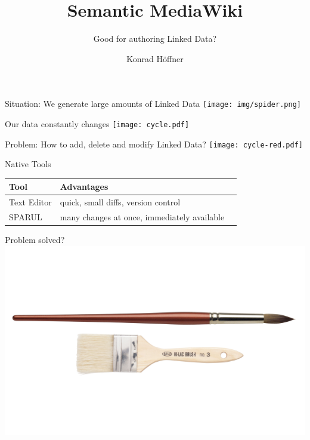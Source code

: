 \documentclass[aspectratio=1610]{beamer}
\title{Semantic MediaWiki}
\subtitle{Good for authoring Linked Data?}
\author{Konrad Höffner}
\begin{document}
\begin{frame}
\titlepage
\end{frame}

\begin{frame}{Situation: We generate large amounts of Linked Data}
\centering
\texttt{[image: img/spider.png]}
\end{frame}

\begin{frame}{Our data constantly changes}
\centering
\texttt{[image: cycle.pdf]}
\end{frame}

\begin{frame}{Problem: How to add, delete and modify Linked Data?}
\centering
\texttt{[image: cycle-red.pdf]}
\end{frame}

\begin{frame}{Native Tools}
\centering
\begin{tabulary}{\textwidth}{lLL}
\toprule
Tool		&Advantages\\					
\midrule
Text Editor	&quick, small diffs, version control\\
SPARUL		&many changes at once, immediately available\\
\bottomrule
\end{tabulary}
\end{frame}

\begin{frame}{Problem solved?}
\centering
\includegraphics[width=0.9\paperwidth]{img/texteditorsparul.png}
\end{frame}
\end{document}
